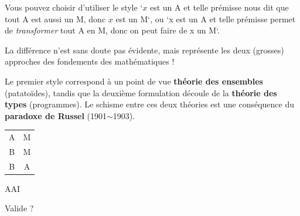 \begin{frame}
	
Vous pouvez choisir d'utiliser le style `$x$ est un A et telle prémisse nous dit que tout A est aussi un M, donc $x$ est un M`\pause, ou `x est un A et telle prémisse permet de \textit{transformer} tout A en M, donc on peut faire de x un M`. \newline \pause

La différence n'est sans doute pas évidente, mais représente les deux (grosses) approches des fondements des mathématiques ! \pause \newline

Le premier style correspond à un point de vue \textbf{théorie des ensembles} (patatoïdes), tandis que la deuxième formulation découle de la \textbf{théorie des types} (programmes). \pause Le schisme entre ces deux théories est une conséquence du \textbf{paradoxe de Russel} (1901$\sim$1903).

\end{frame}



\begin{frame}
	
	\begin{description}[labelindent=6pt,style=multiline,leftmargin=1.3in]
		 \setlength\itemsep{1em}

\item[$2^{\grave{e}me}$ figure] \begin{tabular}{cc}
A & M \\
	B & M \\
\cline{1-2}
		B & A \\
\end{tabular}
\item[Mode] AAI \pause
\item[Question] Valide ? 

	\end{description} 
\end{frame}



